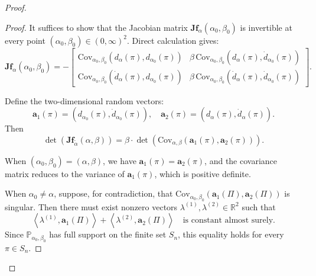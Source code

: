 \documentclass{article}
\renewcommand{\P}{\mathbb{P}}
\begin{document}
\begin{proof}
\begin{proof}
It suffices to show that the Jacobian matrix \(\boldsymbol{J}\boldsymbol{f}_{\alpha}(\alpha_0,\beta_0)\) is invertible at every point \((\alpha_0,\beta_0) \in (0,\infty)^2\).
Direct calculation gives:
\[
\boldsymbol{J}\boldsymbol{f}_{\alpha}(\alpha_0,\beta_0)
= -
\begin{bmatrix}
\mathrm{Cov}_{\alpha_0,\beta_0}\left(d_\alpha(\pi), d_{\alpha_0}(\pi)\right) &
\beta \, \mathrm{Cov}_{\alpha_0,\beta_0}\left(d_\alpha(\pi), \dot{d}_{\alpha_0}(\pi)\right)
\\[6pt]
\mathrm{Cov}_{\alpha_0,\beta_0}\left(\dot{d}_\alpha(\pi), d_{\alpha_0}(\pi)\right) &
\beta \, \mathrm{Cov}_{\alpha_0,\beta_0}\left(\dot{d}_\alpha(\pi), \dot{d}_{\alpha_0}(\pi)\right)
\end{bmatrix}.
\]

Define the two-dimensional random vectors:
\[
\boldsymbol{a}_1(\pi) = \left(d_{\alpha_0}(\pi), \dot{d}_{\alpha_0}(\pi)\right),
\quad
\boldsymbol{a}_2(\pi) = \left(d_{\alpha}(\pi), \dot{d}_{\alpha}(\pi)\right).
\]
Then
\[
\det\left( \boldsymbol{J}\boldsymbol{f}_{\tilde\alpha}(\alpha,\beta) \right)
= \beta \cdot \det\left( \mathrm{Cov}_{\alpha,\beta}\left(\boldsymbol{a}_1(\pi), \boldsymbol{a}_2(\pi)\right) \right).
\]

When \((\alpha_0,\beta_0) = (\alpha,\beta)\), we have \(\boldsymbol{a}_1(\pi) = \boldsymbol{a}_2(\pi)\), and the covariance matrix reduces to the variance of \(\boldsymbol{a}_1(\pi)\), which is positive definite.

When \(\alpha_0 \neq \alpha\),  
suppose, for contradiction, that \(\mathrm{Cov}_{\alpha_0,\beta_0}(\boldsymbol{a}_1(\Pi), \boldsymbol{a}_2(\Pi))\) is singular. Then there must exist nonzero vectors \(\lambda^{(1)}, \lambda^{(2)} \in \mathbb{R}^2\) such that
\begin{equation}\label{eq:invertibility_f_jacobian}
\left\langle \lambda^{(1)}, \boldsymbol{a}_1(\Pi) \right\rangle
+
\left\langle \lambda^{(2)}, \boldsymbol{a}_2(\Pi) \right\rangle
\quad \text{is constant almost surely}.
\end{equation}
Since \(\P_{\alpha_0,\beta_0}\) has full support on the finite set \(S_n\), this equality holds for every \(\pi \in S_n\).



\end{proof}
\end{proof}
\end{document}
